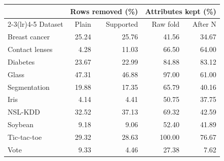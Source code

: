 \begin{tabular}{lrrrr}
\toprule
 & \multicolumn{2}{c}{Rows removed (\%)} & \multicolumn{2}{c}{Attributes kept (\%)} \\
\cmidrule(lr){2-3}\cmidrule(lr){4-5}
Dataset & Plain & Supported & Raw fold & After N \\
\midrule
Breast cancer & 25.24 & 25.76 & 41.56 & 34.67 \\
Contact lenses & 4.28 & 11.03 & 66.50 & 64.00 \\
Diabetes & 23.67 & 22.99 & 84.88 & 83.12 \\
Glass & 47.31 & 46.88 & 97.00 & 61.00 \\
Segmentation & 19.88 & 17.35 & 65.79 & 40.16 \\
Iris & 4.14 & 4.41 & 50.75 & 37.75 \\
NSL-KDD & 32.52 & 37.13 & 69.32 & 42.59 \\
Soybean & 9.18 & 9.06 & 52.40 & 41.89 \\
Tic-tac-toe & 29.32 & 28.63 & 100.00 & 76.67 \\
Vote & 9.33 & 4.46 & 27.38 & 7.62 \\
\bottomrule
\end{tabular}

